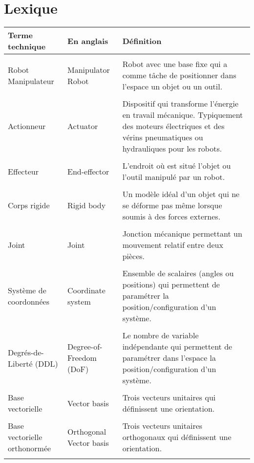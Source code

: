 ﻿\newpage

\section{Lexique}

\begin{center}
\begin{tabular}{  p{3.5cm} p{3.5cm} p{7cm} }
\hline 
\textbf{Terme technique} & \textbf{En anglais} & \textbf{Définition} \\ \hline\hline \\
Robot Manipulateur &  Manipulator Robot &
Robot avec une base fixe qui a comme tâche de positionner dans l'espace un objet ou un outil.
\\  &  \\ 
Actionneur &  Actuator &
Dispositif qui transforme l'énergie en travail mécanique. Typiquement des moteurs électriques et des vérins pneumatiques ou hydrauliques pour les robots.
\\  &  \\ 
Effecteur  & End-effector &
L'endroit où est situé l'objet ou l'outil manipulé par un robot.
\\   &  \\
Corps rigide & Rigid body &
Un modèle idéal d'un objet qui ne se déforme pas même lorsque soumis à des forces externes.
\\   &  \\ 
Joint & Joint &
Jonction mécanique permettant un mouvement relatif entre deux pièces. 
\\  &  \\ 
Système de coordonnées &  Coordinate system &
Ensemble de scalaires (angles ou positions) qui permettent de paramétrer la position/configuration d'un système. 
\\  &  \\ 
Degrés-de-Liberté (DDL) & Degree-of-Freedom (DoF) &
Le nombre de variable indépendante qui permettent de paramétrer dans l'espace la position/configuration d'un système. 
\\  &  \\ 
Base vectorielle  & Vector basis &
Trois vecteurs unitaires qui définissent une orientation. 
\\  &  \\ 
Base vectorielle orthonormée & Orthogonal Vector basis &
Trois vecteurs unitaires orthogonaux qui définissent une orientation. 
\\  &  \\ 

\end{tabular}
\end{center}
